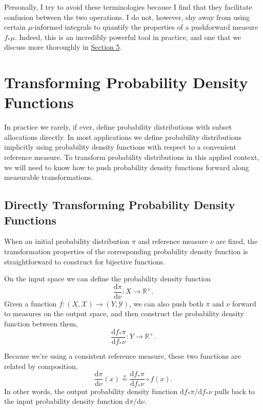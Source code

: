 \documentclass[
  letterpaper,
  DIV=11,
  numbers=noendperiod]{scrartcl}
\begin{document}
Personally, I try to avoid these terminologies because I find that they
facilitate confusion between the two operations. I do not, however, shy
away from using certain \(\mu\)-informed integrals to quantify the
properties of a pushforward measure \(f_{*} \mu\). Indeed, this is an
incredibly powerful tool in practice, and one that we discuss more
thoroughly in \hyperref[sec:1d-pushforward-characterizations]{Section
5}.

\section{Transforming Probability Density
Functions}\label{transforming-probability-density-functions}

In practice we rarely, if ever, define probability distributions with
subset allocations directly. In most applications we define probability
distributions implicitly using probability density functions with
respect to a convenient reference measure. To transform probability
distributions in this applied context, we will need to know how to push
probability density functions forward along measurable transformations.

\subsection{Directly Transforming Probability Density
Functions}\label{directly-transforming-probability-density-functions}

When an initial probability distribution \(\pi\) and reference measure
\(\nu\) are fixed, the transformation properties of the corresponding
probability density function is straightforward to construct for
bijective functions.

On the input space we can define the probability density function \[
\frac{ \mathrm{d} \pi }{ \mathrm{d} \nu} :
X \rightarrow \mathbb{R}^{+}.
\] Given a function
\(f : (X, \mathcal{X}) \rightarrow (Y, \mathcal{Y})\), we can also push
both \(\pi\) and \(\nu\) forward to measures on the output space, and
then construct the probability density function between them, \[
\frac{ \mathrm{d} f_{*} \pi }{ \mathrm{d} f_{*} \nu} :
Y \rightarrow \mathbb{R}^{+}.
\]

Because we're using a consistent reference measure, these two functions
are related by composition, \[
\frac{ \mathrm{d} \pi }{ \mathrm{d} \nu}(x)
\overset{\nu}{=}
\frac{ \mathrm{d} f_{*} \pi }{ \mathrm{d} f_{*} \nu} \circ f(x).
\] In other words, the output probability density function
\(\mathrm{d} f_{*} \pi / \mathrm{d} f_{*} \nu\) pulls back to the input
probability density function \(\mathrm{d} \pi / \mathrm{d} \nu\).
\end{document}
